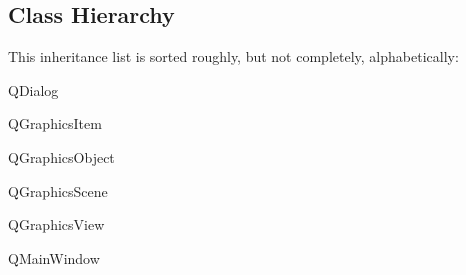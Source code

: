 \subsection{Class Hierarchy}
This inheritance list is sorted roughly, but not completely, alphabetically\+:\begin{DoxyCompactList}
\item {}
\item Q\+Dialog\begin{DoxyCompactList}
\item {}
\item {}
\item {}
\item {}
\item {}
\end{DoxyCompactList}
\item Q\+Graphics\+Item\begin{DoxyCompactList}
\item {}
\item {}
\end{DoxyCompactList}
\item Q\+Graphics\+Object\begin{DoxyCompactList}
\item {}
\item {}
\end{DoxyCompactList}
\item Q\+Graphics\+Scene\begin{DoxyCompactList}
\item {}
\end{DoxyCompactList}
\item Q\+Graphics\+View\begin{DoxyCompactList}
\item {}
\end{DoxyCompactList}
\item Q\+Main\+Window\begin{DoxyCompactList}

\end{DoxyCompactList}
\end{DoxyCompactList}
